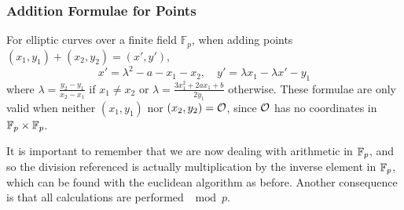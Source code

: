 \subsubsection{Addition Formulae for Points}
For elliptic curves over a finite field $\mathbb{F}_p$, when adding points $(x_1,y_1) + (x_2,y_2) = (x',y')$,
$$x'=\lambda^2 - a - x_1 - x_2,\quad y' = \lambda x_1 -\lambda x' - y_1 $$
where $\lambda = \frac{y_2-y_1}{x_2-x_1}$ if $x_1\neq x_2$ or $\lambda=\frac{3x_1^2 + 2ax_1 + b}{2y_1}$ otherwise.
These formulae are only valid when neither $(x_1,y_1)$ nor $(x_2,y_2) = \mathcal{O}$, since $\mathcal{O}$ has no coordinates in $\mathbb{F}_{p} \times \mathbb{F}_{p}$.

It is important to remember that we are now dealing with arithmetic in $\mathbb{F}_{p}$, and so the division referenced is actually multiplication by the inverse element in $\mathbb{F}_{p}$, which can be found with the euclidean algorithm as before.
Another consequence is that all calculations are performed $\mod p$.

